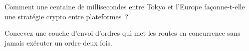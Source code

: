 \begin{interviewq}\label{iq:nw:cross-region-crypto-networks:5}
Comment une centaine de millisecondes entre Tokyo et l'Europe façonne-t-elle une stratégie crypto entre plateformes~?
\end{interviewq}

\begin{interviewq}\label{iq:nw:cross-region-crypto-networks:6}
Concevez une couche d'envoi d'ordres qui met les routes en concurrence sans jamais exécuter un ordre deux fois.
\end{interviewq}
